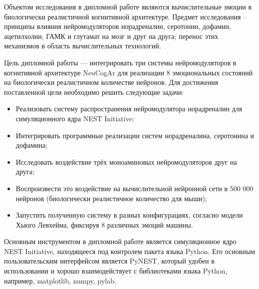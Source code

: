 Объектом исследования в дипломной работе являются вычислительные эмоции в биологически реалистичной когнитивной архитектуре. Предмет исследования – принципы влияния нейромодуляторов норадреналин, серотонин, дофамин, ацетилхолин, ГАМК и глутамат на мозг и друг на друга; перенос этих механизмов в область вычислительных технологий.

Цель дипломной работы — интегрировать три системы нейромодуляторов в когнитивной архитектуре NeuCogAr для реализации 8 эмоциональных состояний на биологически реалистичном количестве нейронов. Для достижения поставленной цели необходимо решить следующие задачи:
\begin{itemize}
\item Реализовать систему распространения нейромодулятора норадреналин для симуляционного ядра NEST Initiative;
\item Интегрировать программные реализации систем норадреналина, серотонина и дофамина;
\item Исследовать воздействие трёх моноаминовых нейромодуляторов друг на друга;
\item Воспроизвести это воздействие на вычислительной нейронной сети в 500 000 нейронов (биологически реалистичное количество для мыши);
\item Запустить полученную систему в разных конфигурациях, согласно модели Хьюго Левхейма, фиксируя 8 различных эмоций машины.
\end{itemize}

Основным инструментом в дипломной работе является симуляционное ядро NEST Initiative, находящееся под контролем пакета языка Python. Его основным пользовательским интерфейсом является PyNEST, который удобен в использовании и хорошо взаимодействует с библиотеками языка Python, например, matplotlib, numpy, pylab.